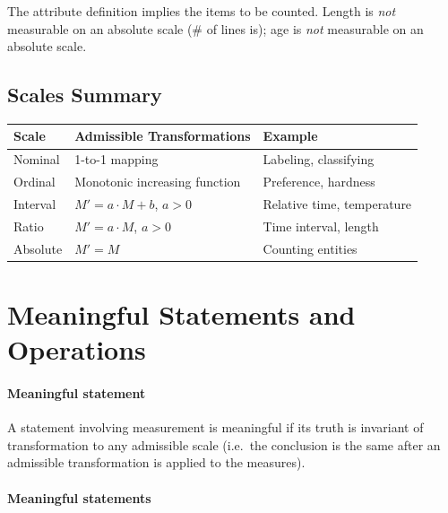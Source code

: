 The attribute definition implies the items to be counted. Length is \emph{not} measurable on an
absolute scale (\# of lines is); age is \emph{not} measurable on an absolute scale.

\subsection{Scales Summary}

\begin{table}[h!]
  \renewcommand{\arraystretch}{1.4}
  \centering
  \begin{tabular}{lll}
    \toprule
    \textbf{Scale} & \textbf{Admissible Transformations} & \textbf{Example}           \\
    \midrule
    Nominal        & 1-to-1 mapping                      & Labeling, classifying      \\
    Ordinal        & Monotonic increasing function       & Preference, hardness       \\
    Interval       & $M' = a \cdot M + b$, $a > 0$       & Relative time, temperature \\
    Ratio          & $M' = a \cdot M$, $a > 0$           & Time interval, length      \\
    Absolute       & $M' = M$                            & Counting entities          \\
    \bottomrule
  \end{tabular}
\end{table}

\section{Meaningful Statements and Operations}

\paragraph{Meaningful statement}
A statement involving measurement is meaningful if its truth is invariant of transformation
to any admissible scale (i.e.\ the conclusion is the same after an admissible transformation
is applied to the measures).

\paragraph{Meaningful statements}

